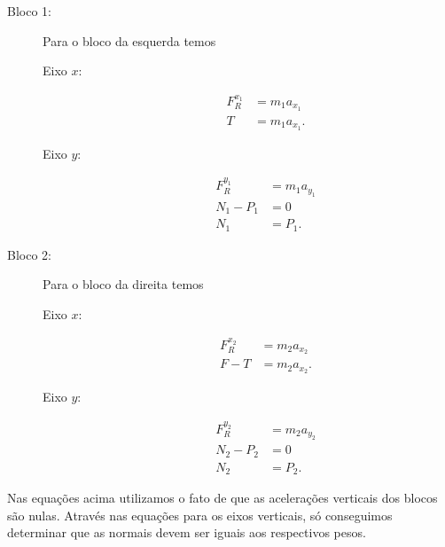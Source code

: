 \begin{description}
    \item[Bloco 1:] Para o bloco da esquerda temos
        \begin{description}
            \item[Eixo $x$:]
                \begin{align}
                    F_R^{x_1} &= m_1 a_{x_1} \\
                    T &= m_1 a_{x_1}. \label{Eq:BlocosAcelLateralX1}
                \end{align}
            \item[Eixo $y$:]
                \begin{align}
                    F_R^{y_1} &= m_1 a_{y_1} \\
                    N_1 - P_1 &= 0 \\
                    N_1 &= P_1.
                \end{align}
        \end{description}
    \item[Bloco 2:] Para o bloco da direita temos
        \begin{description}
            \item[Eixo $x$:]
                \begin{align}
                    F_R^{x_2} &= m_2 a_{x_2} \\
                    F - T &= m_2 a_{x_2}. \label{Eq:BlocosAcelLateralX2}
                \end{align}
            \item[Eixo $y$:]
                \begin{align}
                    F_R^{y_2} &= m_2 a_{y_2} \\
                    N_2 - P_2 &= 0 \\
                    N_2 &= P_2.
                \end{align}
        \end{description}
\end{description}

\noindent{}Nas equações acima utilizamos o fato de que as acelerações verticais dos blocos são nulas. Através nas equações para os eixos verticais, só conseguimos determinar que as normais devem ser iguais aos respectivos pesos.


